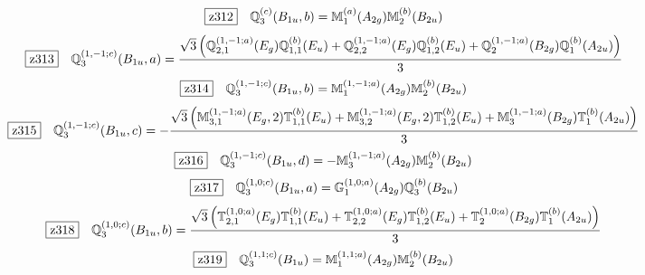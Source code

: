 \documentclass[fleqn,10pt,landscape]{jsarticle}
\begin{document}
\begin{dmath*}
\hspace*{3mm}\fbox{z312}\quad \mathbb{Q}_{3}^{(c)}(B_{1u},b)=\mathbb{M}_{1}^{(a)}(A_{2g}) \mathbb{M}_{2}^{(b)}(B_{2u})
\end{dmath*}
\begin{dmath*}
\hspace*{3mm}\fbox{z313}\quad \mathbb{Q}_{3}^{(1,-1;c)}(B_{1u},a)=\frac{\sqrt{3} \left(\mathbb{Q}_{2,1}^{(1,-1;a)}(E_{g}) \mathbb{Q}_{1,1}^{(b)}(E_{u}) + \mathbb{Q}_{2,2}^{(1,-1;a)}(E_{g}) \mathbb{Q}_{1,2}^{(b)}(E_{u}) + \mathbb{Q}_{2}^{(1,-1;a)}(B_{2g}) \mathbb{Q}_{1}^{(b)}(A_{2u})\right)}{3}
\end{dmath*}
\begin{dmath*}
\hspace*{3mm}\fbox{z314}\quad \mathbb{Q}_{3}^{(1,-1;c)}(B_{1u},b)=\mathbb{M}_{1}^{(1,-1;a)}(A_{2g}) \mathbb{M}_{2}^{(b)}(B_{2u})
\end{dmath*}
\begin{dmath*}
\hspace*{3mm}\fbox{z315}\quad \mathbb{Q}_{3}^{(1,-1;c)}(B_{1u},c)=- \frac{\sqrt{3} \left(\mathbb{M}_{3,1}^{(1,-1;a)}(E_{g},2) \mathbb{T}_{1,1}^{(b)}(E_{u}) + \mathbb{M}_{3,2}^{(1,-1;a)}(E_{g},2) \mathbb{T}_{1,2}^{(b)}(E_{u}) + \mathbb{M}_{3}^{(1,-1;a)}(B_{2g}) \mathbb{T}_{1}^{(b)}(A_{2u})\right)}{3}
\end{dmath*}
\begin{dmath*}
\hspace*{3mm}\fbox{z316}\quad \mathbb{Q}_{3}^{(1,-1;c)}(B_{1u},d)=- \mathbb{M}_{3}^{(1,-1;a)}(A_{2g}) \mathbb{M}_{2}^{(b)}(B_{2u})
\end{dmath*}
\begin{dmath*}
\hspace*{3mm}\fbox{z317}\quad \mathbb{Q}_{3}^{(1,0;c)}(B_{1u},a)=\mathbb{G}_{1}^{(1,0;a)}(A_{2g}) \mathbb{Q}_{3}^{(b)}(B_{2u})
\end{dmath*}
\begin{dmath*}
\hspace*{3mm}\fbox{z318}\quad \mathbb{Q}_{3}^{(1,0;c)}(B_{1u},b)=\frac{\sqrt{3} \left(\mathbb{T}_{2,1}^{(1,0;a)}(E_{g}) \mathbb{T}_{1,1}^{(b)}(E_{u}) + \mathbb{T}_{2,2}^{(1,0;a)}(E_{g}) \mathbb{T}_{1,2}^{(b)}(E_{u}) + \mathbb{T}_{2}^{(1,0;a)}(B_{2g}) \mathbb{T}_{1}^{(b)}(A_{2u})\right)}{3}
\end{dmath*}
\begin{dmath*}
\hspace*{3mm}\fbox{z319}\quad \mathbb{Q}_{3}^{(1,1;c)}(B_{1u})=\mathbb{M}_{1}^{(1,1;a)}(A_{2g}) \mathbb{M}_{2}^{(b)}(B_{2u})
\end{dmath*}
\end{document}
